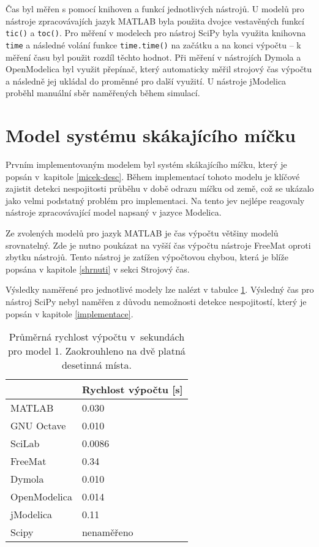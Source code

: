 Čas byl měřen s pomocí knihoven a funkcí jednotlivých nástrojů. U modelů pro nástroje zpracovávajích jazyk MATLAB byla použita dvojce vestavěných funkcí \texttt{tic()} a \texttt{toc()}. Pro měření v modelech pro nástroj SciPy byla využita knihovna \texttt{time} a následné volání funkce \texttt{time.time()} na začátku a na konci výpočtu -- k měření času byl použit rozdíl těchto hodnot. Při měření v nástrojích Dymola a OpenModelica byl využit přepínač, který automaticky měřil strojový čas výpočtu a následně jej ukládal do proměnné pro další využití. U nástroje jModelica proběhl manuální sběr naměřených během simulací.

\section{Model systému skákajícího míčku}
\label{srovnani-micek}
Prvním implementovaným modelem byl systém skákajícího míčku, který je popsán v~kapitole \ref{micek-desc}. Během implementací tohoto modelu je klíčové zajistit detekci nespojitosti průběhu v době odrazu míčku od země, což se ukázalo jako velmi podstatný problém pro implementaci. Na tento jev nejlépe reagovaly nástroje zpracovávající model napsaný v jazyce Modelica.

Ze zvolených modelů pro jazyk MATLAB je čas výpočtu většiny modelů srovnatelný. Zde je nutno poukázat na vyšší čas výpočtu nástroje FreeMat oproti zbytku nástrojů. Tento nástroj je zatížen výpočtovou chybou, která je blíže popsána v kapitole \ref{shrnuti} v sekci Strojový čas.

Výsledky naměřené pro jednotlivé modely lze nalézt v tabulce \ref{tab:micek-tabulka}. Výsledný čas pro nástroj SciPy nebyl naměřen z důvodu nemožnosti detekce nespojitostí, který je popsán v kapitole \ref{implementace}.



\begin{table}[]
\centering
\begin{tabular}{|l|l|}
\hline
             & Rychlost výpočtu {[}s{]} \\ \hline
MATLAB       &            0.030  \\ \hline
GNU Octave   &             0.010\\ \hline
SciLab       &          0.0086\\ \hline
FreeMat &                0.34\\ \hline
Dymola       &         0.010\\ \hline
OpenModelica    &       0.014\\ \hline
jModelica        &     0.11\\ \hline
Scipy           &       nenaměřeno   \\ \hline
\end{tabular}
\caption{Průměrná rychlost výpočtu v~sekundách pro model 1. Zaokrouhleno na dvě platná desetinná místa.}
\label{tab:micek-tabulka}
\end{table}


